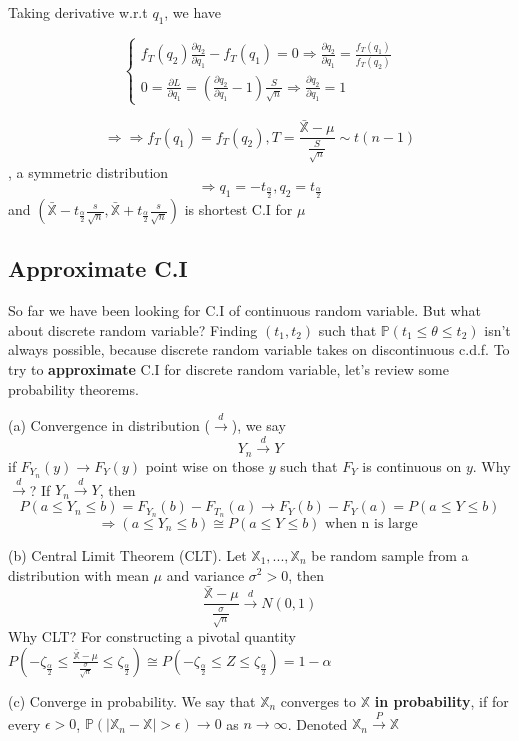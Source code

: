 Taking derivative w.r.t $q_1$, we have

$$\begin{cases}
f_T(q_2)\frac{\partial q_2}{\partial q_1} - f_T(q_1) = 0 \Rightarrow \frac{\partial q_2}{\partial q_1} = \frac{f_T(q_1)}{f_T(q_2)} \\
0 = \frac{\partial L}{\partial q_1} = (\frac{\partial q_2}{\partial q_1} - 1)\frac{S}{\sqrt{n}} \Rightarrow \frac{\partial q_2}{\partial q_1} = 1
\end{cases}$$

$$\Rightarrow \Rightarrow f_T(q_1) = f_T(q_2), T=\frac{\bar{\mathbb{X}}-\mu}{\frac{S}{\sqrt{n}}} \sim t(n-1)$$, a symmetric distribution
$$\Rightarrow q_1 = -t_{\frac{\alpha}{2}}, q_2 = t_{\frac{\alpha}{2}}$$
and $(\bar{\mathbb{X}}-t_{\frac{\alpha}{2}}\frac{s}{\sqrt{n}}, \bar{\mathbb{X}}+t_{\frac{\alpha}{2}}\frac{s}{\sqrt{n}})$ is shortest C.I for $\mu$

\subsection{Approximate C.I}
So far we have been looking for C.I of continuous random variable. But what about discrete random variable? Finding $(t_1, t_2)$ such that $\mathbb{P}(t_1 \leq \theta \leq t_2)$ isn't always possible, because discrete random variable takes on discontinuous c.d.f. To try to \textbf{approximate} C.I for discrete random variable, let's review some probability theorems.

(a) Convergence in distribution ($\overset{d}{\to}$), we say
$$Y_n \overset{d}{\to} Y$$
if $F_{Y_n}(y) \to F_Y(y)$ point wise on those $y$ such that $F_Y$ is continuous on $y$. Why $\overset{d}{\to}$? If $Y_n \overset{d}{\to} Y$, then
$$P(a\leq Y_n \leq b) = F_{Y_n}(b) - F_{T_n}(a) \to F_Y(b)-F_Y(a) = P(a\leq Y \leq b)$$ 
$$\Rightarrow (a\leq Y_n \leq b)  \cong P(a\leq Y \leq b) \text{ when n is large }$$

(b) Central Limit Theorem (CLT). Let $\mathbb{X}_1, ..., \mathbb{X}_n$ be random sample from a distribution with mean $\mu$ and variance $\sigma^2>0$, then
$$\frac{\bar{\mathbb{X}}-\mu}{\frac{\sigma}{\sqrt{n}}} \overset{d}{\to} N(0, 1)$$
Why CLT? For constructing  a pivotal quantity $P(-\zeta_{\frac{\alpha}{2}} \leq \frac{\bar{\mathbb{X}}-\mu}{\frac{\sigma}{\sqrt{n}}} \leq \zeta_{\frac{\alpha}{2}}) \cong P(-\zeta_{\frac{\alpha}{2}} \leq Z \leq \zeta_{\frac{\alpha}{2}}) = 1-\alpha$

(c) Converge in probability. We say that $\mathbb{X}_n$ converges to $\mathbb{X}$ \textbf{in probability}, if for every $\epsilon > 0$, $\mathbb{P}(|\mathbb{X}_n-\mathbb{X}|>\epsilon) \to 0$ as $n \to \infty$. Denoted $\mathbb{X}_n \overset{P}{\to} \mathbb{X}$

